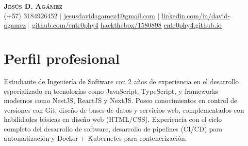 \documentclass[letterpaper,11pt]{article}
\begin{document}
\begin{center}
    \textbf{\Huge \scshape Jesús D. Agámez} \\ \vspace{1pt}
    \small (+57) 3184926452 $|$ \href{mailto:jesusdavidagamez4@gmail.com}{\underline{jesusdavidagamez4@gmail.com}} $|$
    \href{https://linkedin.com/in/david-agamez}{\underline{linkedin.com/in/david-agamez}} $|$
    \href{https://github.com/entr0phy4}{\underline{github.com/entr0phy4}}
    \href{https://app.hackthebox.com/profile/1580898}{\underline{hackthebox/1580898}}
    \href{https://entr0phy4.github.io}{\underline{entr0phy4.github.io}}
\end{center}

\section{Perfil profesional}
    \par
    {Estudiante de Ingeniería de Software con 2 años de experiencia en el desarrollo especializado en tecnologías como JavaScript, TypeScript, y frameworks modernos como NestJS, ReactJS y NextJS. Poseo conocimientos en control de versiones con Git, diseño de bases de datos y servicios web, complementados con habilidades básicas en diseño web (HTML/CSS). Experiencia con el ciclo completo del desarrollo de software, desarrollo de pipelines (CI/CD) para automatización y Docker + Kubernetes para contenerización.}

\end{document}
